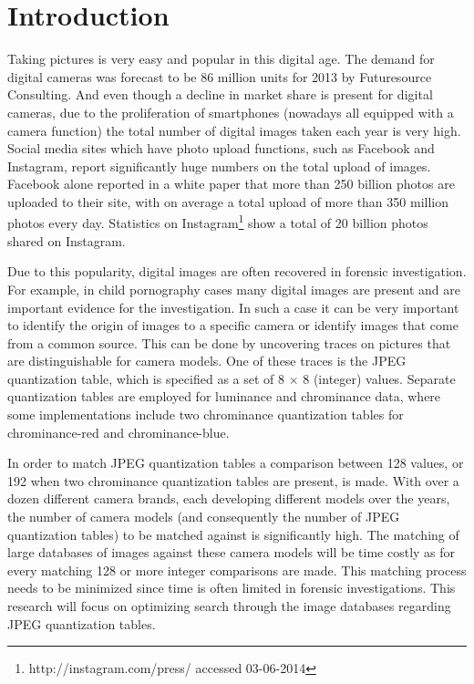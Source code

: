 \documentclass[a4paper,8pt]{article}
\begin{document}
\maketitle

\section*{Introduction}
Taking pictures is very easy and popular in this digital age. The demand for digital cameras was forecast to be 86 million units for 2013 by Futuresource Consulting\cite{futuresource}. And even though a decline in market share is present for digital cameras, due to the  proliferation of smartphones (nowadays all equipped with a camera function) the total number of digital images taken each year is very high. Social media sites which have photo upload functions, such as Facebook and Instagram, report significantly huge numbers on the total upload of images. Facebook alone reported in a white paper \cite{whitefacebook} that more than 250 billion photos are uploaded to their site, with on average a total upload of more than 350 million photos every day. Statistics on Instagram\footnote{http://instagram.com/press/ accessed 03-06-2014} show a total of 20 billion photos shared on Instagram.

Due to this popularity, digital images are often recovered in forensic investigation. For example, in child pornography cases many digital images are present and are important evidence for the investigation. In such a case it can be very important to identify the origin of images to a specific camera or identify images that come from a common source. This can be done by uncovering traces on pictures that are distinguishable for camera models. One of these traces is the JPEG quantization table, which is specified as a set of 8 $\times$ 8 (integer) values. Separate quantization tables are employed for luminance and chrominance data, where some implementations include two chrominance quantization tables for chrominance-red and chrominance-blue. 

In order to match JPEG quantization tables a comparison between 128 values, or 192 when two chrominance quantization tables are present, is made. With over a dozen different camera brands, each developing different models over the years, the number of camera models (and consequently the number of JPEG quantization tables) to be matched against is significantly high. The matching of large databases of images against these camera models will be time costly as for every matching 128 or more integer comparisons are made. This matching process needs to be minimized since time is often limited in forensic investigations. This research will focus on optimizing search through the image databases regarding JPEG quantization tables.
\end{document}

